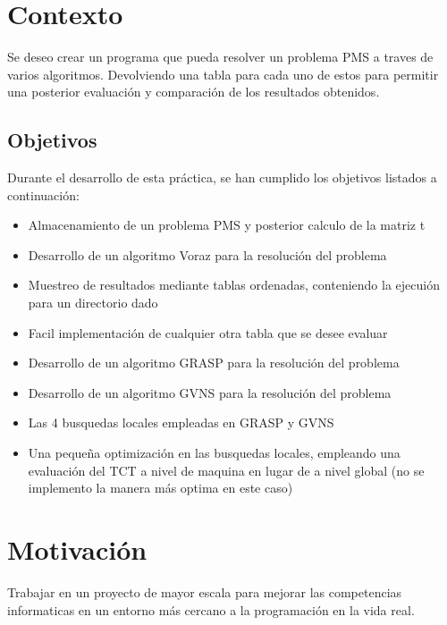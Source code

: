 \section{Contexto}

Se deseo crear un programa que pueda resolver un problema PMS a traves de varios algoritmos. Devolviendo una tabla para cada uno de estos para permitir una posterior evaluación y comparación de los resultados obtenidos.

\subsection{Objetivos}

Durante el desarrollo de esta práctica, se han cumplido los objetivos listados a continuación:
\begin{itemize}
   \item Almacenamiento de un problema PMS y posterior calculo de la matriz t
   \item Desarrollo de un algoritmo Voraz para la resolución del problema
   \item Muestreo de resultados mediante tablas ordenadas, conteniendo la ejecuión para un directorio dado
   \item Facil implementación de cualquier otra tabla que se desee evaluar
   \item Desarrollo de un algoritmo GRASP para la resolución del problema
   \item Desarrollo de un algoritmo GVNS para la resolución del problema
   \item Las 4 busquedas locales empleadas en GRASP y GVNS
   \item Una pequeña optimización en las busquedas locales, empleando una evaluación del TCT a nivel de maquina en lugar de a nivel global (no se implemento la manera más optima en este caso)
\end{itemize}

\section{Motivación}

Trabajar en un proyecto de mayor escala para mejorar las competencias informaticas en un entorno más cercano a la programación en la vida real.